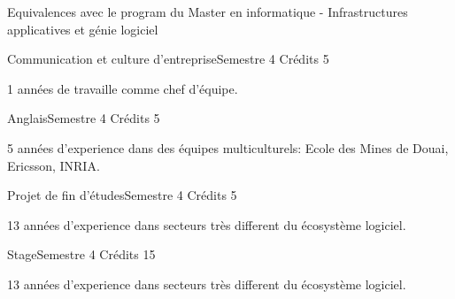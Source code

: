 \documentclass{resume} %
\begin{document}
\begin{rSection}{Equivalences avec le program du Master en informatique - Infrastructures applicatives et génie logiciel}
	\begin{rSubsection}{Communication et culture d'entreprise}{Semestre 4}{ Crédits 5 }
		\item 1 années de travaille comme chef d'équipe. 
	\end{rSubsection}
	\begin{rSubsection}{Anglais}{Semestre 4}{ Crédits 5 }
		\item 5 années d'experience dans des équipes multiculturels: Ecole des Mines de Douai, Ericsson, INRIA.
	\end{rSubsection}
	\begin{rSubsection}{Projet de fin d'études}{Semestre 4}{ Crédits 5 }
		\item 13 années d'experience dans secteurs très different du écosystème logiciel. 
	\end{rSubsection}
	\begin{rSubsection}{Stage}{Semestre 4}{ Crédits 15 }
		\item 13 années d'experience dans secteurs très different du écosystème logiciel. 
	\end{rSubsection}
\end{rSection}
\end{document}
